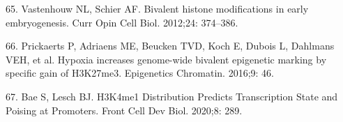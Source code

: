 \documentclass[10pt,letterpaper]{article}
\newenvironment{cslreferences}%
  {}%
  {\par}
\begin{document}
\begin{cslreferences}
\leavevmode\hypertarget{ref-pmid22513113}{}%
65. Vastenhouw NL, Schier AF. Bivalent histone modifications in early
embryogenesis. Curr Opin Cell Biol. 2012;24: 374--386.

\leavevmode\hypertarget{ref-pmid27800026}{}%
66. Prickaerts P, Adriaens ME, Beucken TVD, Koch E, Dubois L, Dahlmans
VEH, et al. Hypoxia increases genome-wide bivalent epigenetic marking by
specific gain of H3K27me3. Epigenetics Chromatin. 2016;9: 46.

\leavevmode\hypertarget{ref-pmid32432110}{}%
67. Bae S, Lesch BJ. H3K4me1 Distribution Predicts Transcription State
and Poising at Promoters. Front Cell Dev Biol. 2020;8: 289.
\end{cslreferences}

\nolinenumbers
\end{document}
